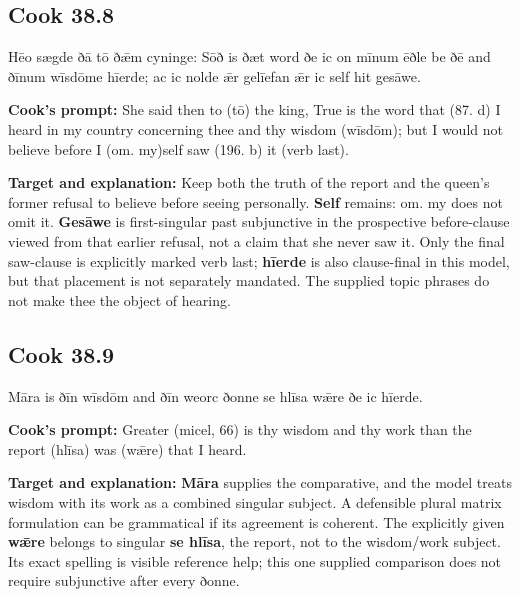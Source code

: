 \par\begin{minipage}{\linewidth}\raggedright
\subsection*{Cook 38.8}

Hēo sægde ðā tō ðǣm cyninge: Sōð is ðæt word ðe ic on mīnum ēðle be ðē and ðīnum wīsdōme hīerde; ac ic nolde ǣr gelīefan ǣr ic self hit gesāwe.

\textbf{Cook's prompt:} She said then to (tō) the king, True is the word that (87. d) I heard in my country concerning thee and thy wisdom (wīsdōm); but I would not believe before I (om. my)self saw (196. b) it (verb last).

\textbf{Target and explanation:} Keep both the truth of the report and the queen's former refusal to believe before seeing personally. \textbf{Self} remains: om. my does not omit it. \textbf{Gesāwe} is first-singular past subjunctive in the prospective before-clause viewed from that earlier refusal, not a claim that she never saw it. Only the final saw-clause is explicitly marked verb last; \textbf{hīerde} is also clause-final in this model, but that placement is not separately mandated. The supplied topic phrases do not make thee the object of hearing.

\end{minipage}\par\addvspace{4pt}

\par\begin{minipage}{\linewidth}\raggedright
\subsection*{Cook 38.9}

Māra is ðīn wīsdōm and ðīn weorc ðonne se hlīsa wǣre ðe ic hīerde.

\textbf{Cook's prompt:} Greater (micel, 66) is thy wisdom and thy work than the report (hlīsa) was (wǣre) that I heard.

\textbf{Target and explanation:} \textbf{Māra} supplies the comparative, and the model treats wisdom with its work as a combined singular subject. A defensible plural matrix formulation can be grammatical if its agreement is coherent. The explicitly given \textbf{wǣre} belongs to singular \textbf{se hlīsa}, the report, not to the wisdom/\allowbreak{}work subject. Its exact spelling is visible reference help; this one supplied comparison does not require subjunctive after every ðonne.

\end{minipage}\par\addvspace{4pt}

